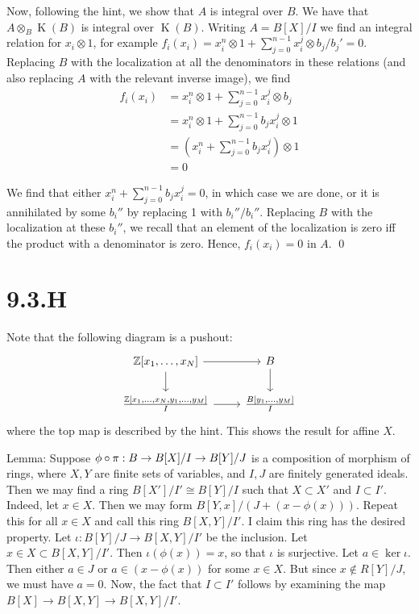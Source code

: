 \documentclass{article}
\begin{document}
Now, following the hint, we show that $A$ is integral over
$B$. We have that $A \otimes_B \operatorname{K}(B)$ is integral over
$\operatorname{K}(B)$. Writing $A=B[X]/I$ we find an integral
relation for $x_i \otimes 1$, for example $f_i(x_i)=x_i^n \otimes 1+\sum_{j=0}^{n-1} x_i^j \otimes b_j/b_j'=0$.
Replacing $B$ with the localization at all the denominators
in these relations (and also replacing $A$ with the
relevant inverse image), we find
\begin{align*}
    f_i(x_i) & =x_i^n \otimes 1+\sum_{j=0}^{n-1} x_i^j \otimes b_j  \\
             & =x_i^n \otimes 1+\sum_{j=0}^{n-1} b_jx_i^j \otimes 1 \\
             & = (x_i^n+\sum_{j=0}^{n-1} b_jx_i^j) \otimes 1        \\
             & =0
\end{align*}

We find that either $x_i^n+\sum_{j=0}^{n-1} b_jx_i^j=0$, in which case we are done, or it
is annihilated by some $b_i''$ by replacing 1 with
$b_i''/b_i''$. Replacing $B$ with the
localization at these $b_i''$, we recall that an element of the
localization is zero iff the product with a denominator is zero. Hence,
$f_i(x_i)=0$ in $A$. \qed

\section{9.3.H}
Note that the following diagram is a pushout: \[\begin{tikzcd}
        {\Z[x_1, \dots, x_N]} & B \\{\frac{\Z[x_1,\dots, x_N,y_1, \dots, y_M]}{I}}
        & {\frac{B[y_1, \dots, y_M]}{I}}
        \arrow[from=1-2, to=2-2]
        \arrow[from=1-1, to=1-2]
        \arrow[from=2-1, to=2-2]
        \arrow[from=1-1, to=2-1]
    \end{tikzcd}\] where the
top map is described by the hint. This shows the result for affine
$X$.

Lemma: Suppose $\phi \circ \pi: B \to B[X]/I \to
    B[Y]/J$ is a composition of morphism of rings,
where $X, Y$ are finite sets of variables, and
$I, J$ are finitely generated ideals. Then we may find a ring
$B[X']/I' \cong B[Y]/I$ such that $X \subset X'$ and
$I \subset I'$. Indeed, let $x \in X$. Then we may form
$B[Y, x]/(J+(x-\phi(x)))$. Repeat this for all $x \in X$ and call
this ring $B[X, Y]/I'$. I claim this ring has the desired property.
Let $\iota: B[Y]/J \to B[X, Y]/I'$ be the inclusion. Let $x \in X \subset B[X, Y]/I'$. Then
$\iota(\phi(x))=x$, so that $\iota$ is surjective. Let
$a \in \ker \iota$. Then either $a \in J$ or
$a \in (x-\phi(x))$ for some $x \in X$. But since
$x \notin R[Y]/J$, we must have $a = 0$. Now, the fact
that $I \subset I'$ follows by examining the map
$B[X] \to B[X, Y] \to
    B[X, Y]/I'$.
\end{document}
